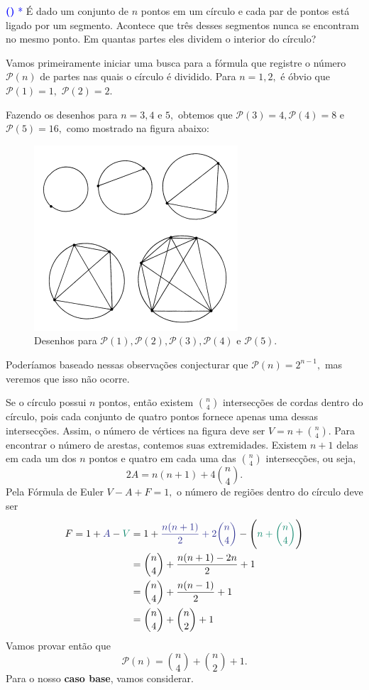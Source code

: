 \documentclass[12pt, a4paper]{article}
\newcounter{exercicio}[section]
\newenvironment{exercicio}[1][]{\refstepcounter{exercicio}\par\medskip
 \textcolor{blue}{\bf(\theexercicio)} \rmfamily}{\medskip }
\begin{document}
\begin{exercicio}\textcolor{Blue}{*}
É dado um conjunto de $n$ pontos em um círculo e cada par de pontos está ligado por um segmento. Acontece que três desses segmentos nunca se encontram no mesmo ponto. Em quantas partes eles dividem o interior do círculo?
\end{exercicio}
\begin{solution}
Vamos primeiramente iniciar uma busca para a fórmula que registre o número $\mathcal{P}(n)$ de partes nas quais o círculo é dividido. Para $n = 1, 2,$ é óbvio que $\mathcal{P}(1) = 1,$ $\mathcal{P}(2) = 2.$ 

Fazendo os desenhos para $n = 3, 4$ e $5,$ obtemos que $\mathcal{P}(3) = 4, \mathcal{P}(4) = 8$ e $\mathcal{P}(5) = 16,$ como mostrado na figura abaixo:
\newpage
\begin{figure}[!htb]
    \centering
    \includegraphics[scale=1.25]{Listas/lista_1ex18.png}
    \caption{Desenhos para $\mathcal{P}(1), \mathcal{P}(2), \mathcal{P}(3), \mathcal{P}(4)$ e $\mathcal{P}(5).$}
    \label{figuraa}
\end{figure}
Poderíamos baseado nessas observações conjecturar que $\mathcal{P}(n) = 2^{n-1},$ mas veremos que isso não ocorre. 

Se o círculo possui $n$ pontos, então existem $\binom{n}{4}$ intersecções de cordas dentro do círculo, pois cada conjunto de quatro pontos fornece apenas uma dessas intersecções. Assim, o número de vértices na figura deve ser $V = n + \binom{n}{4}.$ Para encontrar o número de arestas, contemos suas extremidades. Existem $n+1$ delas em cada um dos $n$ pontos e quatro em cada uma das $\binom{n}{4}$ intersecções, ou seja,
\[
2A = n(n+1) + 4 \binom{n}{4}. 
\]
Pela Fórmula de Euler $V - A + F = 1,$ o número de regiões dentro do círculo deve ser
\begin{align*}
    F = 1 + \textcolor{Blue}{A} - \textcolor{PineGreen}{V} &= 1 + \textcolor{Blue}{\frac{n(n+1)}{2} + 2 \binom{n}{4}} - \left(\textcolor{PineGreen}{ n + \binom{n}{4}}\right) 
    \\&= \binom{n}{4} + \frac{n(n+1) -2n}{2} + 1
    \\&= \binom{n}{4} + \frac{n(n-1)}{2} + 1
    \\&= \binom{n}{4} + \binom{n}{2} + 1
\end{align*}
Vamos provar então que 
\[
\mathcal{P}(n) = \binom{n}{4} + \binom{n}{2} + 1.
\]
Para o nosso \textbf{caso base}, vamos considerar.


\end{solution}
\end{document}
